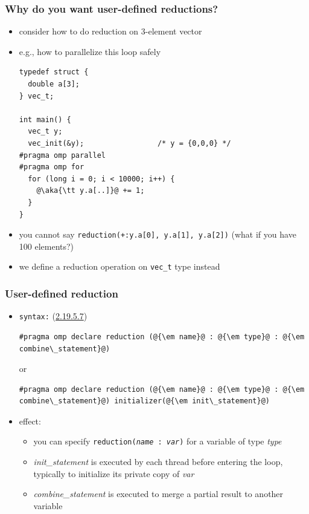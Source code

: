 \documentclass[12pt,dvipdfmx]{beamer}
\newcommand{\sectionompdeclarereduction}{{\href{https://www.openmp.org/spec-html/5.0/openmpsu107.html\#x140-5800002.19.5}{2.19.5.7}}}
\newcommand{\ao}[1]{{\color{blue}#1}}
\newcommand{\aka}[1]{{\color{red}#1}}
\begin{document}
\begin{frame}[fragile]
  \frametitle{Why do you want user-defined reductions?}
  \begin{itemize}
  \item consider how to do reduction on 3-element vector
  \item e.g., how to parallelize this loop safely
\begin{lstlisting}
typedef struct {
  double a[3];
} vec_t;

int main() {
  vec_t y;
  vec_init(&y);                 /* y = {0,0,0} */
#pragma omp parallel
#pragma omp for
  for (long i = 0; i < 10000; i++) {
    @\aka{\tt y.a[..]}@ += 1;
  }
}
\end{lstlisting}
\item you cannot say \aka{\tt reduction(+:y.a[0], y.a[1], y.a[2])}
  (what if you have 100 elements?)
  
\item we define a reduction operation on {\tt vec\_t} type instead
\end{itemize}
\end{frame}

\begin{frame}[fragile]
\frametitle{User-defined reduction}
\begin{itemize}
\item \ao{\tt syntax:} (\sectionompdeclarereduction)
\begin{lstlisting}
#pragma omp declare reduction (@{\em name}@ : @{\em type}@ : @{\em combine\_statement}@)
\end{lstlisting}
or
\begin{lstlisting}
#pragma omp declare reduction (@{\em name}@ : @{\em type}@ : @{\em combine\_statement}@) initializer(@{\em init\_statement}@)
\end{lstlisting}

\item \ao{effect:}
  \begin{itemize}
  \item you can specify {\tt reduction({\it name} : {\it var})}
    for a variable of type {\it type}
  \item {\it init\_statement} is executed by each thread before entering the loop, typically to initialize its private copy of {\it var}
  \item {\it combine\_statement} is executed
    to merge a partial result to another variable
  \end{itemize}
\end{itemize}
\end{frame}
\end{document}
